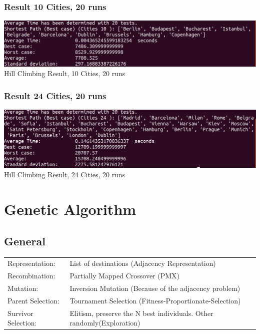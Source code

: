 \documentclass[10pt,a4paper]{article}
\begin{document}
	\subsubsection{Result 10 Cities, 20 runs}
	\begin{center}
		\includegraphics[width=1\linewidth]{pictures/hillClimbing/cities10}
		Hill Climbing Result, 10 Cities, 20 runs
	\end{center}
	\subsubsection{Result 24 Cities, 20 runs}
	\begin{center}
		\includegraphics[width=1\linewidth]{pictures/hillClimbing/cities24}
		Hill Climbing Result, 24 Cities, 20 runs
	\end{center}
	\section{Genetic Algorithm}
\subsection{General}
	\begin{tabular}{ l l } 
		Representation: 	& List of destinations (Adjacency Representation) \\
		Recombination: 		& Partially Mapped Crossover (PMX) \\
		Mutation: 			& Inversion Mutation (Because of the adjacency problem)	\\
		Parent Selection:	& Tournament Selection (Fitness-Proportionate-Selection)	\\
		Survivor Selection:	& Elitism, preserve the N best individuals. Other randomly(Exploration)\\ 
	\end{tabular}
\end{document}
